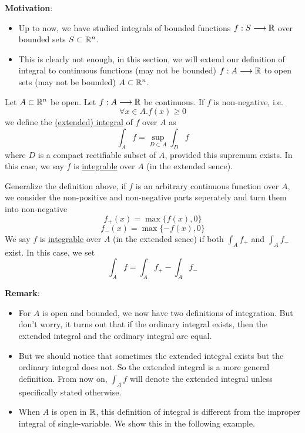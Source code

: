 \noindent \textbf{Motivation}:
\begin{itemize}
    \item Up to now, we have studied integrals of bounded functions $f:S\longrightarrow\mathbb{R}$ over bounded sets $S\subset \mathbb{R}^n$.
    \item This is clearly not enough, in this section, we will extend our definition of integral to continuous functions (may not be bounded) $f:A\longrightarrow\mathbb{R}$ to open sets (may not be bounded) $A\subset\mathbb{R}^n$.
\end{itemize}

\begin{definition}
    Let $A\subset\mathbb{R}^n$ be open. Let $f:A\longrightarrow\mathbb{R}$ be continuous. If $f$ is non-negative, i.e.$$\forall x \in A.f(x)\geq0$$
    we define the \underline{(extended) integral} of $f$ over $A$ as $$\int_Af=\sup_{D\subset A}\int_Df$$
    where $D$ is a compact rectifiable subset of $A$, provided this supremum exists. In this case, we say $f$ is \underline{integrable} over $A$ (in the extended sence).
\end{definition}

\begin{definition}
    Generalize the definition above, if $f$ is an arbitrary continuous function over $A$, we consider the non-positive and non-negative parts seperately and turn them into non-negative
    $$f_+(x)=\max\{f(x),0\}$$
    $$f_-(x)=\max\{-f(x),0\}$$
    We say $f$ is \underline{integrable} over $A$  (in the extended sence) if both $\int_Af_+$ and $\int_Af_-$ exist. In this case, we set $$\int_Af=\int_Af_+-\int_Af_-$$
\end{definition}

\noindent \textbf{Remark}:
\begin{itemize}
    \item For $A$ is open and bounded, we now have two definitions of integration. But don't worry, it turns out that if the ordinary integral exists, then the extended integral and the ordinary integral are equal.
    \item But we should notice that sometimes the extended integral exists but the ordinary integral does not. So the extended integral is a more general definition. From now on, $\int_Af$ will denote the extended integral unless specifically stated otherwise.
    \item When $A$ is open in $\mathbb{R}$, this definition of integral is different from the improper integral of single-variable. We show this in the following example.
\end{itemize}

